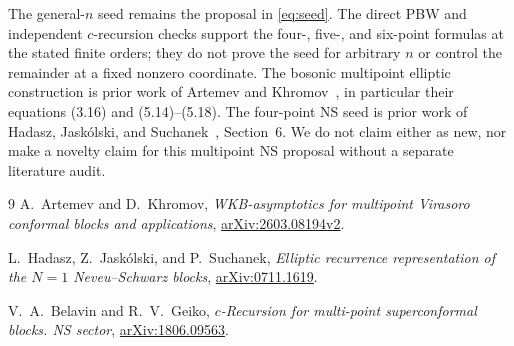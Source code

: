 \documentclass[11pt]{article}
\numberwithin{equation}{section}
\begin{document}
The general-$n$ seed remains the proposal in \eqref{eq:seed}. The direct
PBW and independent $c$-recursion checks support the four-, five-, and six-point formulas at the
stated finite orders; they do not prove the seed for arbitrary $n$ or
control the remainder at a fixed nonzero coordinate. The bosonic
multipoint elliptic construction is prior work of Artemev and
Khromov~\cite{AK}, in particular their equations (3.16) and (5.14)--(5.18).
The four-point NS seed is prior work of Hadasz, Jask\'olski, and
Suchanek~\cite{HJS}, Section~6. We do not claim either as new, nor make a
novelty claim for this multipoint NS proposal without a separate
literature audit.

\begin{samepage}
\begin{thebibliography}{9}
A.~Artemev and D.~Khromov,
\emph{WKB-asymptotics for multipoint Virasoro conformal blocks and
applications}, \href{https://arxiv.org/abs/2603.08194v2}{arXiv:2603.08194v2}.

L.~Hadasz, Z.~Jask\'olski, and P.~Suchanek,
\emph{Elliptic recurrence representation of the $N=1$ Neveu--Schwarz
blocks}, \href{https://arxiv.org/abs/0711.1619}{arXiv:0711.1619}.

V.~A.~Belavin and R.~V.~Geiko,
\emph{$c$-Recursion for multi-point superconformal blocks. NS sector},
\href{https://arxiv.org/abs/1806.09563}{arXiv:1806.09563}.
\end{thebibliography}
\end{samepage}
\end{document}
